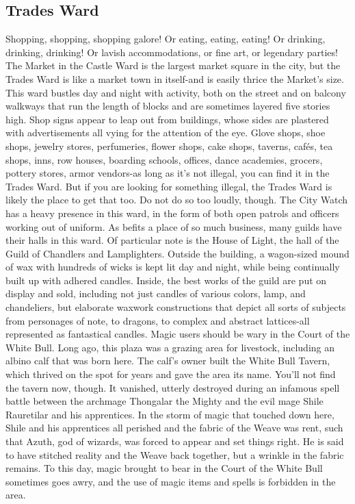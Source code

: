 \documentclass[10pt,a4paper,twoside,twocolumn,openany,nodeprecatedcode]{dndbook}
\begin{document}
\subsection{Trades Ward}
Shopping, shopping, shopping galore! Or eating, eating, eating! Or drinking, drinking, drinking! Or lavish accommodations, or fine art, or legendary parties! The Market in the Castle Ward is the largest market square in the city, but the Trades Ward is like a market town in itself-and is easily thrice the Market's size.
This ward bustles day and night with activity, both on the street and on balcony walkways that run the length of blocks and are sometimes layered five stories high. Shop signs appear to leap out from buildings, whose sides are plastered with advertisements all vying for the attention of the eye. Glove shops, shoe shops, jewelry stores, perfumeries, flower shops, cake shops, taverns, cafés, tea shops, inns, row houses, boarding schools, offices, dance academies, grocers, pottery stores, armor vendors-as long as it's not illegal, you can find it in the Trades Ward. But if you are looking for something illegal, the Trades Ward is likely the place to get that too. Do not do so too loudly, though. The City Watch has a heavy presence in this ward, in the form of both open patrols and officers working out of uniform.
As befits a place of so much business, many guilds have their halls in this ward. Of particular note is the House of Light, the hall of the Guild of Chandlers and Lamplighters. Outside the building, a wagon-sized mound of wax with hundreds of wicks is kept lit day and night, while being continually built up with adhered candles. Inside, the best works of the guild are put on display and sold, including not just candles of various colors, lamp, and chandeliers, but elaborate waxwork constructions that depict all sorts of subjects from personages of note, to dragons, to complex and abstract lattices-all represented as fantastical candles.
Magic users should be wary in the Court of the White Bull. Long ago, this plaza was a grazing area for livestock, including an albino calf that was born here. The calf's owner built the White Bull Tavern, which thrived on the spot for years and gave the area its name. You'll not find the tavern now, though. It vanished, utterly destroyed during an infamous spell battle between the archmage Thongalar the Mighty and the evil mage Shile Rauretilar and his apprentices. In the storm of magic that touched down here, Shile and his apprentices all perished and the fabric of the Weave was rent, such that Azuth, god of wizards, was forced to appear and set things right. He is said to have stitched reality and the Weave back together, but a wrinkle in the fabric remains. To this day, magic brought to bear in the Court of the White Bull sometimes goes awry, and the use of magic items and spells is forbidden in the area.
\end{document}
